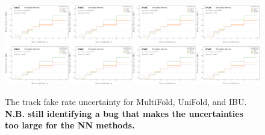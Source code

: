 \begin{figure}[h!]
\includegraphics[width=0.25\textwidth,page=67]{figures/SimResults/TrackJet_SystEffect.pdf}\includegraphics[width=0.25\textwidth,page=71]{figures/SimResults/TrackJet_SystEffect.pdf}\includegraphics[width=0.25\textwidth,page=75]{figures/SimResults/TrackJet_SystEffect.pdf}\includegraphics[width=0.25\textwidth,page=79]{figures/SimResults/TrackJet_SystEffect.pdf}\\
\includegraphics[width=0.25\textwidth,page=83]{figures/SimResults/TrackJet_SystEffect.pdf}\includegraphics[width=0.25\textwidth,page=87]{figures/SimResults/TrackJet_SystEffect.pdf}\includegraphics[width=0.25\textwidth,page=91]{figures/SimResults/TrackJet_SystEffect.pdf}\includegraphics[width=0.25\textwidth,page=95]{figures/SimResults/TrackJet_SystEffect.pdf}
\caption{The track fake rate uncertainty for MultiFold, UniFold, and IBU.  \textbf{N.B. still identifying a bug that makes the uncertainties too large for the NN methods.}}
\label{fig:simresultsmulti_trackjetuncertsl3}
\end{figure}

